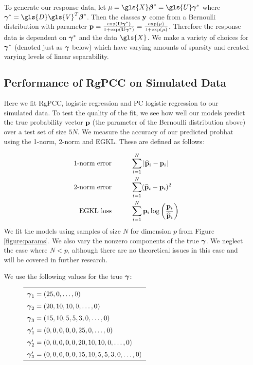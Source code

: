 \documentclass[main.tex]{subfiles}
\begin{document}
To generate our response data, let $\mu = \gls{X} \bbeta^* = \gls{U} \bgamma^*$ where $\bgamma^* = \gls{D} \gls{V}^T \bbeta^*$. Then the classes $\mathbf{y}$ come from a Bernoulli distribution with parameter $\mathbf{p} = \frac{\text{exp}(\mathbf{U} \boldsymbol \gamma^*)}{1 + \text{exp}(\mathbf{U} \boldsymbol \gamma^*)} = \frac{\text{exp}(\mu)}{1 + \text{exp}(\mu)}$. Therefore the response data is dependent on $\boldsymbol \gamma^*$ and the data $\gls{X}$. We make a variety of choices for $\boldsymbol \gamma^*$ (denoted just as $\boldsymbol \gamma$ below) which have varying amounts of sparsity and created varying levels of linear separability.

%
%
%
%
%
%
%
%
%
%
%
%
%
%
%

\subsection{Performance of RgPCC on Simulated Data}
Here we fit RgPCC, logistic regression and PC logistic regression to our simulated data. To test the quality of the fit, we see how well our models predict the true probability vector $\mathbf{p}$ (the parameter of the Bernoulli distribution above) over a test set of size $5N$. We measure the accuracy of our predicted \gls{probhat} using the 1-norm, 2-norm and EGKL. These are defined as follows:

\begin{align*}
	\text{1-norm error} & \hspace{1cm} \sum_{i = 1}^N |\widehat{\mathbf{p}}_i - \mathbf{p}_i| \\
	\text{2-norm error} & \hspace{1cm} \sum_{i = 1}^N (\widehat{\mathbf{p}}_i - \mathbf{p}_i)^2 \\
	\text{EGKL loss} & \hspace{1cm} \sum_{i = 1}^N \mathbf{p}_i \log \left ( \frac{\mathbf{p}_i}{\widehat{\mathbf{p}}_i} \right )
\end{align*}
We fit the models using samples of size $N$ for dimension $p$ from Figure \ref{figure:params}. We also vary the nonzero components of the true $\boldsymbol \gamma$. We neglect the case where $N < p$, although there are no theoretical issues in this case and will be covered in further research.

We use the following values for the true $\boldsymbol \gamma$:
\begin{figure}[H]
	\begin{tabular}{l}
		$\boldsymbol \gamma_1 = (25, 0, \ldots , 0)$ \\
		$\boldsymbol \gamma_2 = (20, 10, 10, 0, \ldots , 0)$ \\
		$\boldsymbol \gamma_3 = (15, 10, 5, 5, 3, 0, \ldots , 0)$\\
		$\boldsymbol \gamma_1' = (0, 0, 0, 0, 0, 25, 0, \ldots , 0)$ \\
		$\boldsymbol \gamma_2' = (0, 0, 0, 0, 0,  20, 10, 10, 0, \ldots , 0)$ \\
		$\boldsymbol \gamma_3' = (0, 0, 0, 0, 0,  15, 10, 5, 5, 3, 0, \ldots , 0)$
	\end{tabular}
\end{figure}
\end{document}
